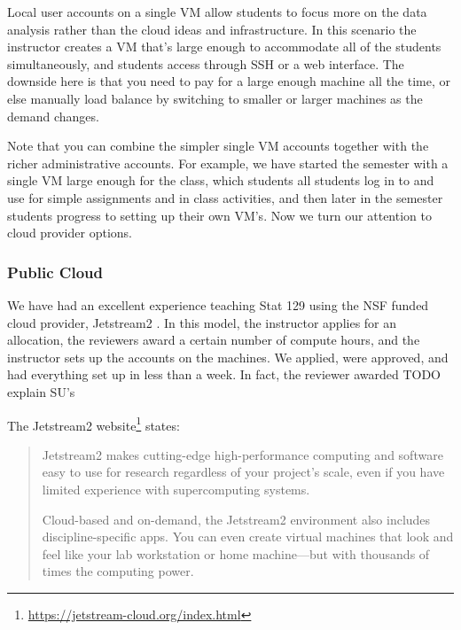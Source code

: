 \documentclass[12pt]{article}
\begin{document}
Local user accounts on a single VM allow students to focus more on the data analysis rather than the cloud ideas and infrastructure.
In this scenario the instructor creates a VM that's large enough to accommodate all of the students simultaneously, and students access through SSH or a web interface.
The downside here is that you need to pay for a large enough machine all the time, or else manually load balance by switching to smaller or larger machines as the demand changes.

Note that you can combine the simpler single VM accounts together with the richer administrative accounts.
For example, we have started the semester with a single VM large enough for the class, which students all students log in to and use for simple assignments and in class activities, and then later in the semester students progress to setting up their own VM's.
Now we turn our attention to cloud provider options.



\subsubsection{Public Cloud}

We have had an excellent experience teaching Stat 129 using the NSF funded cloud provider, Jetstream2 \cite{hancock2021jetstream2}.
In this model, the instructor applies for an allocation, the reviewers award a certain number of compute hours, and the instructor sets up the accounts on the machines.
We applied, were approved, and had everything set up in less than a week.
In fact, the reviewer awarded TODO explain SU's

The Jetstream2 website\footnote{\url{https://jetstream-cloud.org/index.html}} states:
\begin{quote}
Jetstream2 makes cutting-edge high-performance computing and software easy to use for research regardless of your project’s scale, even if you have limited experience with supercomputing systems.

Cloud-based and on-demand, the Jetstream2 environment also includes discipline-specific apps. You can even create virtual machines that look and feel like your lab workstation or home machine—but with thousands of times the computing power.
\end{quote}
\end{document}
